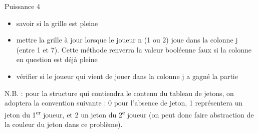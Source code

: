 \begin{Exercice}{Puissance 4}
	\begin{itemize}
		\item 
			savoir si la grille est pleine
		\item 
			mettre la grille à jour lorsque le joueur n (1 ou 2) joue dans la
			colonne j (entre 1 et 7). Cette méthode renverra la valeur booléenne
			faux si la colonne en question est déjà pleine
		\item 
			vérifier si le joueur qui vient de jouer dans la colonne j a gagné la
			partie
	\end{itemize}
	
	N.B. : pour la structure qui contiendra le contenu du tableau de jetons,
	on adoptera la convention suivante : 0 pour l’absence de jeton, 1
	représentera un jeton du 1\textsuperscript{er} joueur, et 2 un jeton du
	2\textsuperscript{e} joueur (on peut donc faire abstraction de la
	couleur du jeton dans ce problème).
	
\end{Exercice}

